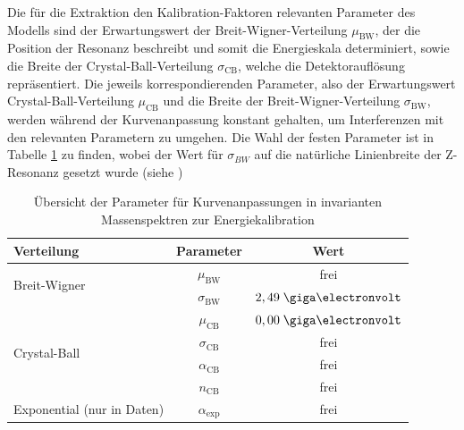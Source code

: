 Die für die Extraktion den Kalibration-Faktoren relevanten Parameter des
Modells sind der Erwartungswert der Breit-Wigner-Verteilung $\mu_\text{BW}$,
der die Position der Resonanz beschreibt und somit die Energieskala
determiniert, sowie die Breite der Crystal-Ball-Verteilung $\sigma_\text{CB}$,
welche die Detektorauflösung repräsentiert. Die jeweils korrespondierenden
Parameter, also der Erwartungswert Crystal-Ball-Verteilung $\mu_\text{CB}$ und
die Breite der Breit-Wigner-Verteilung $\sigma_\text{BW}$, werden während der
Kurvenanpassung konstant gehalten, um Interferenzen mit den relevanten
Parametern zu umgehen. Die Wahl der festen Parameter ist in Tabelle
\ref{tab:fit_parameters} zu finden, wobei der Wert für $\sigma_{BW}$ auf die
natürliche Linienbreite der Z-Resonanz gesetzt wurde (siehe \cite{PhysRevD.86.010001})

\begin{table}[h]
    \centering
    \begin{tabular}{|l|c|c|}
        \hline
        \textbf{Verteilung} & \textbf{Parameter} & \textbf{Wert} \\
        \hline \hline
        \multirow{2}{*}{Breit-Wigner} & $\mu_\text{BW}$      & frei       \\
                                      & $\sigma_\text{BW}$   & $2,49\GeV$ \\
        \hline
        \multirow{4}{*}{Crystal-Ball} & $\mu_\text{CB}$      & $0,00\GeV$ \\
                                      & $\sigma_\text{CB}$   & frei       \\
                                      & $\alpha_\text{CB}$   & frei       \\
                                      & $n_\text{CB}$        & frei       \\
        \hline
        Exponential (nur in Daten)    & $\alpha_\text{exp}$  & frei       \\
        \hline
    \end{tabular}
    \caption{Übersicht der Parameter für Kurvenanpassungen in invarianten
        Massenspektren zur Energiekalibration}
    \label{tab:fit_parameters}
\end{table}

